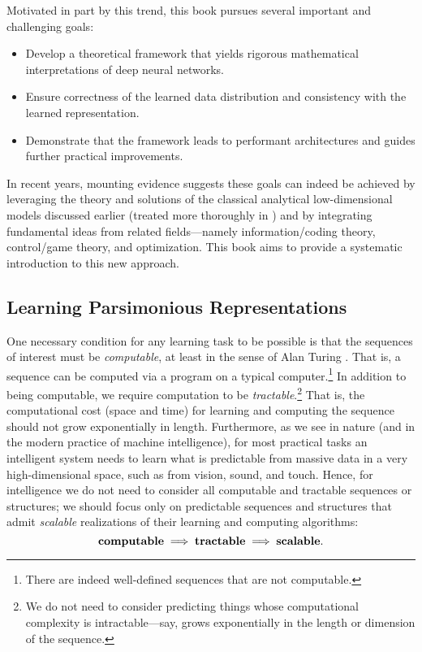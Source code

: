 \documentclass[../../book-main.tex]{subfiles}
\begin{document}
Motivated in part by this trend, this book pursues several important and challenging goals:
\begin{itemize}
    \item Develop a theoretical framework that yields rigorous mathematical interpretations of deep neural networks.
    \item Ensure correctness of the learned data distribution and consistency with the learned representation.
    \item Demonstrate that the framework leads to performant architectures and guides further practical improvements.
\end{itemize}
In recent years, mounting evidence suggests these goals can indeed be achieved by leveraging the theory and solutions of the classical analytical low-dimensional models discussed earlier (treated more thoroughly in ) and by integrating fundamental ideas from related fields---namely information/coding theory, control/game theory, and optimization. This book aims to provide a systematic introduction to this new approach.

\subsection{Learning Parsimonious Representations}
\label{sec:computational-approach-compression}
One necessary condition for any learning task to be possible is that the sequences of interest must be \textit{computable}, at least in the sense of Alan Turing \cite{Turing-1936}. That is, a sequence can be computed via a program on a typical computer.\footnote{There are indeed well-defined sequences that are not computable.} In addition to being computable, we require computation to be \textit{tractable}.\footnote{We do not need to consider predicting things whose computational complexity is intractable---say, grows exponentially in the length or dimension of the sequence.} That is, the computational cost (space and time) for learning and computing the sequence should not grow exponentially in length. Furthermore, as we see in nature (and in the modern practice of machine intelligence), for most practical tasks an intelligent system needs to learn what is predictable from massive data in a very high-dimensional space, such as from vision, sound, and touch. Hence, for intelligence we do not need to consider all computable and tractable sequences or structures; we should focus only on predictable sequences and structures that admit \textit{scalable} realizations of their learning and computing algorithms:
\begin{equation}
    \text{\textbf{computable}} \;
   \Longrightarrow \; \text{\textbf{tractable}} \; \Longrightarrow \; 
   \text{\textbf{scalable}}.
\end{equation}
\end{document}
